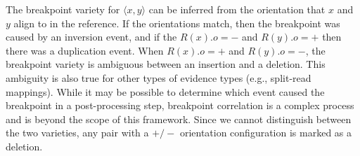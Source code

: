 \documentclass[11pt]{article}
\begin{document}

The breakpoint variety for $\langle x,y \rangle$ can be inferred from the 
orientation that $x$ and $y$ align to in the reference.  If the orientations
match, then the breakpoint was caused by an inversion event, and if the
$R(x).o=-$ and $R(y).o=+$ then there was a duplication event.  When $R(x).o=+$
and $R(y).o=-$, the breakpoint variety is ambiguous between an insertion and a
deletion.  This ambiguity is also true for other types of evidence types (e.g.,
split-read mappings).  While it may be possible to determine which event caused
the breakpoint in a post-processing step, breakpoint correlation is a complex
process and is beyond the scope of this framework.  Since we cannot distinguish
between the two varieties, any pair with a $+/-$ orientation configuration is
marked as a deletion.  

\end{document}
